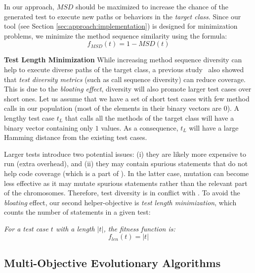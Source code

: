 In our approach, $MSD$ should be maximized to increase the chance of the generated test to execute new paths or behaviors in the \textit{target class}. Since our tool (see Section \ref{sec:approach:implementation}) is designed for minimization problems, we minimize the method sequence similarity using the formula:
\begin{equation}
    f_{MSD}(t) = 1 - MSD(t)
\end{equation}



\textbf{Test Length Minimization}
While increasing method sequence diversity can help to execute diverse paths of the target class, a previous study~\cite{albunian2017diversity} also showed that \textit{test diversity metrics} (such as call sequence diversity) can reduce coverage. This is due to the \textit{bloating effect}, \ie diversity will also promote larger test cases over short ones. Let us assume that we have a set of short test cases with few method calls in our population (most of the elements in their binary vectors are $0$). A lengthy test case $t_L$ that calls all the methods of the target class will have a binary vector containing only $1$ values. As a consequence, $t_L$ will have a large Hamming distance from the existing test cases. 

Larger tests introduce two potential issues: (i) they are likely more expensive to run (extra overhead), and (ii) they may contain spurious statements that do not help code coverage (which is a part of \CrashFunction). In the latter case, mutation can become less effective as it may mutate spurious statements rather than the relevant part of the chromosomes. Therefore, test diversity is in conflict with \CrashFunction. 
To avoid the \textit{bloating} effect, our second helper-objective is \textit{test length minimization}, which counts the number of statements in a given test:

\begin{definition}
\textit{For a test case $t$ with a length $|t|$, the fitness function is:}
\begin{equation}
 f_{len}(t) = |t|
 \end{equation}
\end{definition}



\subsection{Multi-Objective Evolutionary Algorithms}

